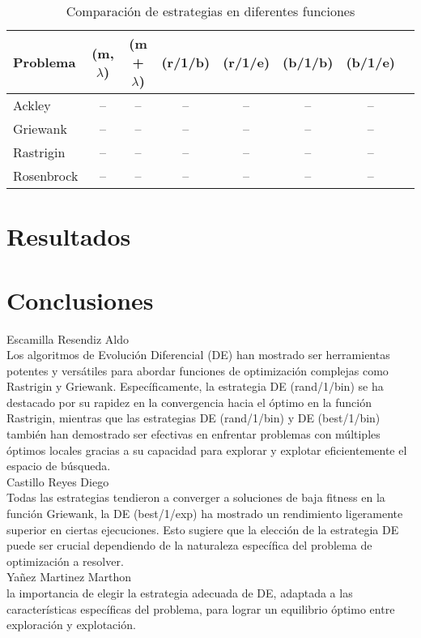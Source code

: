 \documentclass{report}
\begin{document}
\begin{table}[ht]
\centering
\caption{Comparación de estrategias en diferentes funciones}
\begin{tabular}{>{\raggedright}p{3cm}ccccccc}
\toprule
\textbf{Problema} & \textbf{(m, $\lambda$)} & \textbf{(m + $\lambda$)} & \textbf{(r/1/b)} & \textbf{(r/1/e)} & \textbf{(b/1/b)} & \textbf{(b/1/e)} \\
\midrule
Ackley & -- & -- & -- & -- & -- & -- \\
Griewank & -- & -- & -- & -- & -- & -- \\
Rastrigin & -- & -- & -- & -- & -- & -- \\
Rosenbrock & -- & -- & -- & -- & -- & -- \\
\bottomrule
\end{tabular}
\end{table}

\section{Resultados}

\section{Conclusiones}

Escamilla Resendiz Aldo\\
Los algoritmos de Evolución Diferencial (DE) han mostrado ser herramientas potentes y versátiles para abordar funciones de optimización complejas como Rastrigin y Griewank. Específicamente, la estrategia DE (rand/1/bin) se ha destacado por su rapidez en la convergencia hacia el óptimo en la función Rastrigin, mientras que las estrategias DE (rand/1/bin) y DE (best/1/bin) también han demostrado ser efectivas en enfrentar problemas con múltiples óptimos locales gracias a su capacidad para explorar y explotar eficientemente el espacio de búsqueda.\\
Castillo Reyes Diego\\
Todas las estrategias tendieron a converger a soluciones de baja fitness en la función Griewank, la DE (best/1/exp) ha mostrado un rendimiento ligeramente superior en ciertas ejecuciones. Esto sugiere que la elección de la estrategia DE puede ser crucial dependiendo de la naturaleza específica del problema de optimización a resolver.\\
Yañez Martinez Marthon\\
la importancia de elegir la estrategia adecuada de DE, adaptada a las características específicas del problema, para lograr un equilibrio óptimo entre exploración y explotación.
\end{document}
